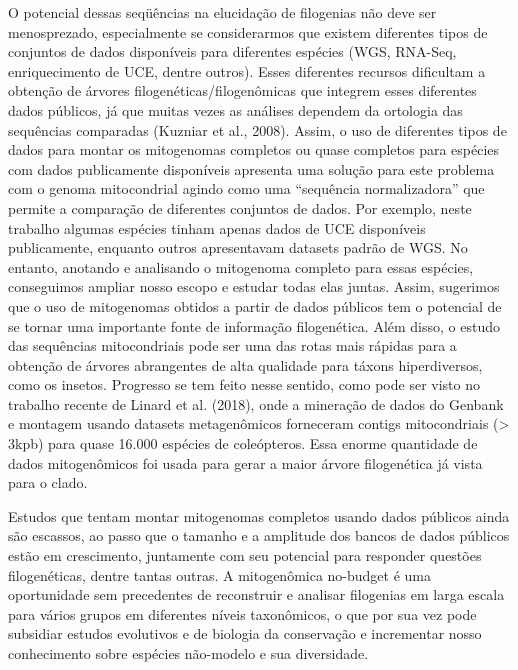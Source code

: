 \documentclass[../DISSERTACAO_MAIN.tex]{subfiles}
\begin{document}
	O potencial dessas seqüências na elucidação de filogenias não deve ser menosprezado, especialmente se considerarmos que existem diferentes tipos de conjuntos de dados disponíveis para diferentes espécies (WGS, RNA-Seq, enriquecimento de UCE, dentre outros). Esses diferentes recursos dificultam a obtenção de árvores filogenéticas/filogenômicas que integrem esses diferentes dados públicos, já que muitas vezes as análises dependem da ortologia das sequências comparadas (Kuzniar et al., 2008). Assim, o uso de diferentes tipos de dados para montar os mitogenomas completos ou quase completos para espécies com dados publicamente disponíveis apresenta uma solução para este problema com o genoma mitocondrial agindo como uma “sequência normalizadora” que permite a comparação de diferentes conjuntos de dados. Por exemplo, neste trabalho algumas espécies tinham apenas dados de UCE disponíveis publicamente, enquanto outros apresentavam datasets padrão de WGS. No entanto, anotando e analisando o mitogenoma completo para essas espécies, conseguimos ampliar nosso escopo e estudar todas elas juntas. Assim, sugerimos que o uso de mitogenomas obtidos a partir de dados públicos tem o potencial de se tornar uma importante fonte de informação filogenética. Além disso, o estudo das sequências mitocondriais pode ser uma das rotas mais rápidas para a obtenção de árvores abrangentes de alta qualidade para táxons hiperdiversos, como os insetos. Progresso se tem feito nesse sentido, como pode ser visto no trabalho recente de Linard et al. (2018), onde a mineração de dados do Genbank e montagem usando datasets metagenômicos forneceram contigs mitocondriais (> 3kpb) para quase 16.000 espécies de coleópteros. Essa enorme quantidade de dados mitogenômicos foi usada para gerar a maior árvore filogenética já vista para o clado.
	
	Estudos que tentam montar mitogenomas completos usando dados públicos ainda são escassos, ao passo que o tamanho e a amplitude dos bancos de dados públicos estão em crescimento, juntamente com seu potencial para responder questões filogenéticas, dentre tantas outras. A mitogenômica no-budget é uma oportunidade sem precedentes de reconstruir e analisar filogenias em larga escala para vários grupos em diferentes níveis taxonômicos, o que por sua vez pode subsidiar estudos evolutivos e de biologia da conservação e incrementar nosso conhecimento sobre espécies não-modelo e sua diversidade.
	
\end{document}
